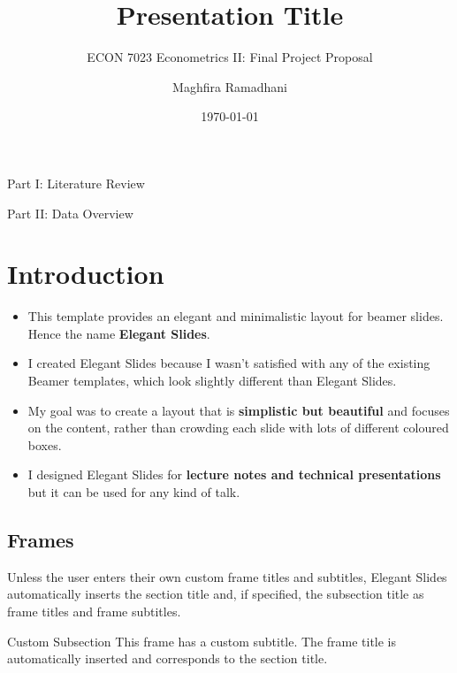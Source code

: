 \documentclass[
11pt,notheorems,hyperref={pdfauthor=whatever}
]{beamer}
\title[
]{Presentation Title}
\subtitle{ECON 7023 Econometrics II: Final Project Proposal}
\author[
]{
    Maghfira Ramadhani 
}
\institute{
    School of Economics, \\
    Georgia Institute of Technology}
\date{\today}
\begin{document}
{
\begin{frame}
  \titlepage
\end{frame}
}
\addtocounter{framenumber}{-1}

\begin{frame}{Part I: Literature Review}
    \tableofcontents[part=1]
\end{frame}
\begin{frame}{Part II: Data Overview}
    \tableofcontents[part=2]
\end{frame}


\section{Introduction}
\begin{frame}
\begin{itemize}
    \item This template provides an  elegant and minimalistic layout for beamer slides. Hence the name \alert{\textbf{Elegant Slides}}.
    \item I created Elegant Slides because I wasn't satisfied with any of the existing Beamer templates, which look slightly different than Elegant Slides.
    \item My goal was to create a layout that is \alert{\textbf{simplistic but beautiful}} and focuses on the content, rather than crowding each slide with lots of different coloured boxes.
    \item I designed Elegant Slides for \alert{\textbf{lecture notes and technical presentations}} but it can be used for any kind of talk. 
\end{itemize}
     
\end{frame}

\subsection{Frames}
\begin{frame}
    Unless the user enters their own custom frame titles and subtitles, Elegant Slides automatically inserts the section title and, if specified, the subsection title as frame titles and frame subtitles.
\end{frame}

\begin{frame}{}{Custom Subsection}
    This frame has a custom subtitle. The frame title is automatically inserted and corresponds to the section title.
\end{frame}
\end{document}
